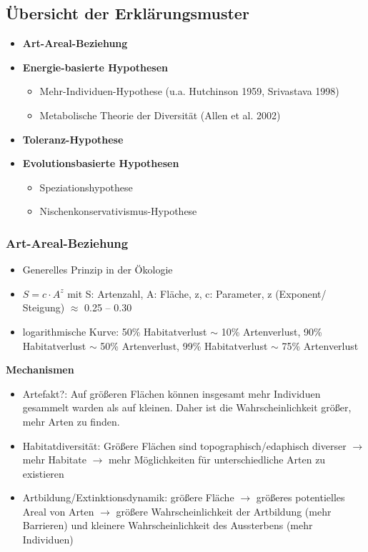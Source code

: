 \newpage
\subsection{Übersicht der Erklärungsmuster}
\begin{itemize}
	\item \textbf{Art-Areal-Beziehung}
	\item \textbf{Energie-basierte Hypothesen}
	\begin{itemize}
		\item Mehr-Individuen-Hypothese (u.a. Hutchinson 1959, Srivastava 1998)
		\item Metabolische Theorie der Diversität (Allen et al. 2002)
	\end{itemize}
	\item \textbf{Toleranz-Hypothese}
	\item \textbf{Evolutionsbasierte Hypothesen}
	\begin{itemize}
		\item Speziationshypothese
		\item Nischenkonservativismus-Hypothese
	\end{itemize}
\end{itemize}

\subsubsection{Art-Areal-Beziehung}
\begin{itemize}
	\item Generelles Prinzip in der Ökologie
	\item $S=c \cdot A^z$ mit S: Artenzahl, A: Fläche, z, c: Parameter, z (Exponent/ Steigung) $\approx$ 0.25 – 0.30
	\item logarithmische Kurve: 50\% Habitatverlust $\sim$ 10\% Artenverlust, 90\% Habitatverlust $\sim$ 50\% Artenverlust, 99\% Habitatverlust $\sim$ 75\% Artenverlust
\end{itemize}

\textbf{Mechanismen}
\begin{itemize}
	\item Artefakt?: Auf größeren Flächen können insgesamt mehr Individuen gesammelt warden als auf kleinen. Daher ist die Wahrscheinlichkeit größer, mehr Arten zu finden.
	\item Habitatdiversität: Größere Flächen sind topographisch/edaphisch diverser $\rightarrow$ mehr Habitate $\rightarrow$ mehr Möglichkeiten für unterschiedliche Arten zu existieren
	\item Artbildung/Extinktionsdynamik: größere Fläche $\rightarrow$ größeres potentielles Areal von Arten $\rightarrow$ größere Wahrscheinlichkeit der Artbildung (mehr Barrieren) und kleinere Wahrscheinlichkeit des Aussterbens (mehr Individuen)
\end{itemize}

